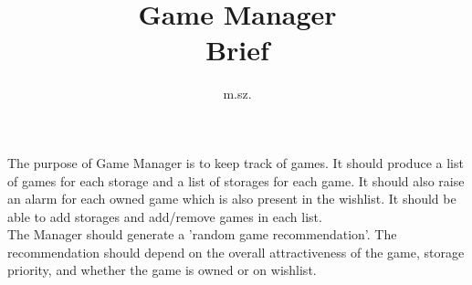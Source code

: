 \documentclass{article}
\title{Game Manager\\ Brief}
\author{m.sz.}
\begin{document}
\maketitle

The purpose of Game Manager is to keep track of games. It should produce a list
of games for each storage and a list of storages for each game. It should also
raise an alarm for each owned game which is also present in the wishlist. It
should be able to add storages and add/remove games in each list.\\
The Manager should generate a 'random game recommendation'. The recommendation
should depend on the overall attractiveness of the game, storage priority, and 
whether the game is owned or on wishlist.
\end{document}
